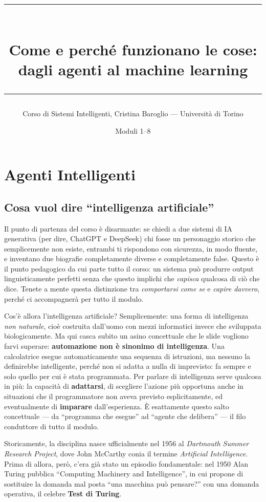 \documentclass[11pt,a4paper]{article}
\title{\vspace{-1cm}{\large Sistemi Intelligenti --- Appunti discorsivi}\\[0.3cm]
  \rule{\linewidth}{1pt}\\[0.3cm]
  {\Large\bfseries Come e perché funzionano le cose: dagli agenti al machine learning}\\[0.3cm]
  \rule{\linewidth}{1pt}}
\author{Corso di Sistemi Intelligenti, Cristina Baroglio --- Università di Torino}
\date{Moduli 1--8}
\begin{document}
\maketitle
\tableofcontents
\newpage

\section{Agenti Intelligenti}

\subsection{Cosa vuol dire ``intelligenza artificiale''}

Il punto di partenza del corso è disarmante: se chiedi a due sistemi di IA generativa (per dire, ChatGPT e DeepSeek) chi fosse un personaggio storico che semplicemente non esiste, entrambi ti rispondono con sicurezza, in modo fluente, e inventano due biografie completamente diverse e completamente false. Questo è il punto pedagogico da cui parte tutto il corso: un sistema può produrre output linguisticamente perfetti senza che questo implichi che \emph{capisca} qualcosa di ciò che dice. Tenete a mente questa distinzione tra \emph{comportarsi come se} e \emph{capire davvero}, perché ci accompagnerà per tutto il modulo.

Cos'è allora l'intelligenza artificiale? Semplicemente: una forma di intelligenza \emph{non naturale}, cioè costruita dall'uomo con mezzi informatici invece che sviluppata biologicamente. Ma qui casca subito un asino concettuale che le slide vogliono farvi superare: \textbf{automazione non è sinonimo di intelligenza}. Una calcolatrice esegue automaticamente una sequenza di istruzioni, ma nessuno la definirebbe intelligente, perché non si adatta a nulla di imprevisto: fa sempre e solo quello per cui è stata programmata. Per parlare di intelligenza serve qualcosa in più: la capacità di \textbf{adattarsi}, di scegliere l'azione più opportuna anche in situazioni che il programmatore non aveva previsto esplicitamente, ed eventualmente di \textbf{imparare} dall'esperienza. È esattamente questo salto concettuale --- da ``programma che esegue'' ad ``agente che delibera'' --- il filo conduttore di tutto il modulo.

Storicamente, la disciplina nasce ufficialmente nel 1956 al \emph{Dartmouth Summer Research Project}, dove John McCarthy conia il termine \emph{Artificial Intelligence}. Prima di allora, però, c'era già stato un episodio fondamentale: nel 1950 Alan Turing pubblica ``Computing Machinery and Intelligence'', in cui propone di sostituire la domanda mal posta ``una macchina può pensare?'' con una domanda operativa, il celebre \textbf{Test di Turing}.
\end{document}
